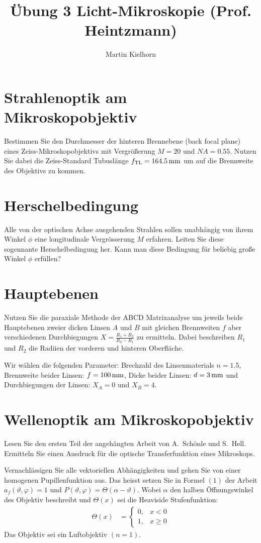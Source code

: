 \documentclass{article}
\begin{document}
\author{Martin Kielhorn}
\title{\"Ubung 3 Licht-Mikroskopie (Prof. Heintzmann)}
\maketitle

\section{Strahlenoptik am Mikroskopobjektiv}
Bestimmen Sie den Durchmesser der hinteren Brennebene (back focal
plane) eines Zeiss-Mikroskopobjektivs mit Vergr\"o\ss erung $M=20$ und
$NA=0.55$. Nutzen Sie dabei die Zeiss-Standard Tubusl\"ange
$f_\textrm{TL}=\unit[164.5]{mm}$ um auf die Brennweite des Objektivs
zu kommen.

\section{Herschelbedingung}
Alle von der optischen Achse ausgehenden Strahlen sollen unabh\"angig
von ihrem Winkel $\phi$ eine longitudinale Vergr\"osserung $M$
erfahren. Leiten Sie diese sogennante Herschelbedingung her. Kann man
diese Bedingung f\"ur beliebig gro\ss e Winkel $\phi$ erf\"ullen?


\section{Hauptebenen}
Nutzen Sie die paraxiale Methode der ABCD Matrixanalyse um jeweils
beide Hauptebenen zweier dicken Linsen $A$ und $B$ mit gleichen Brennweiten $f$
aber verschiedenen Durchbiegungen $X=\frac{R_1+R_2}{R_2-R_1}$ zu
ermitteln. Dabei beschreiben $R_1$ und $R_2$ die Radiien der vorderen
und hinteren Oberfl\"ache.

Wir w\"ahlen die folgenden Parameter: Brechzahl des Linsenmaterials
$n=1.5$, Brennweite beider Linsen: $f=\unit[100]{mm}$, Dicke beider
Linsen: $d=\unit[3]{mm}$ und Durchbiegungen der Linsen: $X_A=0$ und
$X_B=4$.


\section{Wellenoptik am Mikroskopobjektiv}
Lesen Sie den ersten Teil der angeh\"angten Arbeit von A.~Sch\"onle
und S.~Hell. Ermitteln Sie einen Ausdruck f\"ur die optische
Transferfunktion eines Mikroskops.

Vernachl\"assigen Sie alle vektoriellen Abh\"angigkeiten und gehen Sie
von einer homogenen Pupillenfunktion aus. Das heisst setzen Sie in
Formel $(1)$ der Arbeit $a_f(\vartheta,\varphi)=1$ und
$P(\vartheta,\varphi)=\Theta(\alpha-\vartheta)$. Wobei $\alpha$ den halben
\"Offnungswinkel des Objektiv beschreibt und $\Theta(x)$ sei die
Heaviside Stufenfunktion:
\begin{align}
  \Theta(x)&=\begin{cases}
  0, & x<0 \\
  1, & x \ge 0
  \end{cases}
\end{align}
Das Objektiv sei ein Luftobjektiv $(n=1)$.


\end{document}
